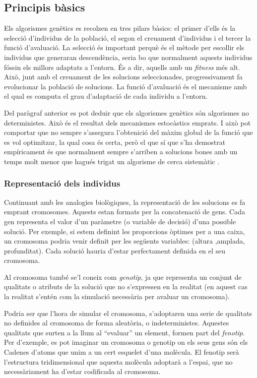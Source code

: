\subsection{Principis bàsics}

Els algorismes genètics es recolzen en tres pilars bàsics: el primer d'ells és
la selecció d'individus de la població, el segon el creuament d'individus i el
tercer la funció d'avaluació. La selecció és important perquè és el mètode per
escollir els individus que generaran descendència, seria bo que normalment
aquests individus fóssin els millors adaptats a l'entorn. És a dir, aquells amb
un \emph{fitness} més alt.  Això, junt amb el creuament de les solucions
seleccionades, progressivament fa evolucionar la població de solucions. La
funció d'avaluació és el mecanisme amb el qual es computa el grau d'adaptació de
cada individu a l'entorn.

Del paràgraf anterior es pot deduir que els algorismes genètics són algorismes no deterministes.
Això és el resultat dels mecanismes estocàstics emprats. I això pot comportar
que no sempre s'assegura l'obtenició del màxim global de la funció que es vol
optimitzar, la qual cosa és certa, però el que sí que s'ha demostrat
empíricament és que normalment sempre s'arriben a solucions bones amb un temps
molt menor que hagués trigat un algorisme de cerca sistemàtic \cite{BBM93}. 

\subsubsection{Representació dels individus}

Continuant amb les analogies biològiques, la representació de les solucions es
fa emprant cromosomes. Aquests estan formats per la concatenació de gens. Cada
gen representa el valor d'un paràmetre (o variable de decisió) d'una possible
solució.  Per exemple, si estem definint les proporcions òptimes per a una
caixa, un cromosoma podria venir definit per les següents variables:
(altura ,amplada, profunditat). Cada solució hauria d'estar perfectament definida
en el seu cromosoma.

Al cromosoma també se'l coneix com \emph{genotip}, ja que representa un conjunt de
qualitats o atributs de la solució que no s'expressen en la realitat (en aquest
cas la realitat s'entén com la simulació necessària per avaluar un cromosoma).

Podria ser que l'hora de simular el cromosoma, s'adoptaren una serie de
qualitats no definides al cromosoma de forma aleatòria, o indeterministes.
Aquestes qualitats que surten a la llum al ``evaluar'' un element, formen part
del \emph{fenotip}.  Per d'exemple, es pot imaginar un cromosoma o genotip on
els seus gens són els Cadenes d'atoms que unim a un cert esquelet d'una
molècula\cite{GEB79}. El fenotip serà l'estructura tridimensional que aquesta
molècula adoptarà a l'espai, que no necessàriament ha d'estar codificada al
cromosoma.

